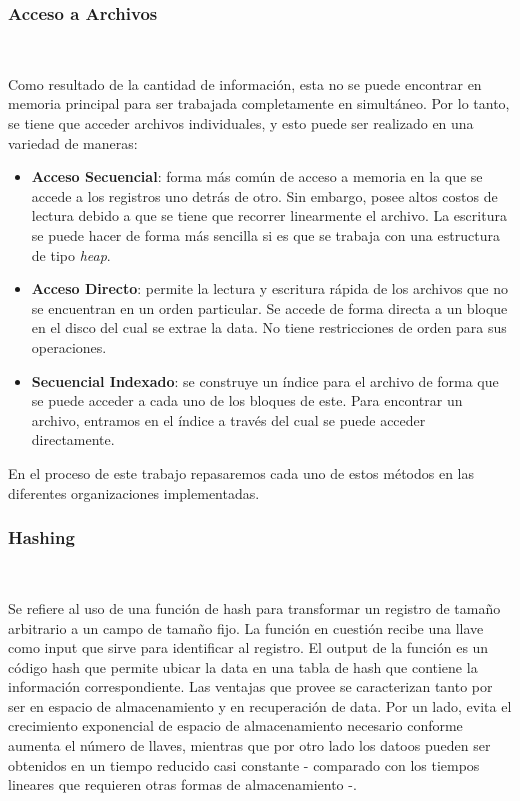 \documentclass{article}
\begin{document}
      \subsubsection{Acceso a Archivos} 
        
        Como resultado de la cantidad de información, esta no se puede encontrar en memoria principal para ser trabajada completamente en simultáneo. Por lo tanto, se tiene que acceder archivos individuales, y esto puede ser realizado en una variedad de maneras:

        \begin{itemize}
          
         \item \textbf{Acceso Secuencial}: forma más común de acceso a memoria en la que se accede a los registros uno detrás de otro. Sin embargo, posee altos costos de lectura debido a que se tiene que recorrer linearmente el archivo. La escritura se puede hacer de forma más sencilla si es que se trabaja con una estructura de tipo \textit{heap}.
         
         \item \textbf{Acceso Directo}: permite la lectura y escritura rápida de los archivos que no se encuentran en un orden particular. Se accede de forma directa a un bloque en el disco del cual se extrae la data. No tiene restricciones de orden para sus operaciones.
         
         \item \textbf{Secuencial Indexado}: se construye un índice para el archivo de forma que se puede acceder a cada uno de los bloques de este. Para encontrar un archivo, entramos en el índice a través del cual se puede acceder directamente. 

        \end{itemize}

        En el proceso de este trabajo repasaremos cada uno de estos métodos en las diferentes organizaciones implementadas.

      \subsubsection{Hashing} 
        
        Se refiere al uso de una función de hash para transformar un registro de tamaño arbitrario a un campo de tamaño fijo. La función en cuestión recibe una llave como input que sirve para identificar al registro. El output de la función es un código hash que permite ubicar la data en una tabla de hash que contiene la información correspondiente. Las ventajas que provee se caracterizan tanto por ser en espacio de almacenamiento y en recuperación de data. Por un lado, evita el crecimiento exponencial de espacio de almacenamiento necesario conforme aumenta el número de llaves, mientras que por otro lado los datoos pueden ser obtenidos en un tiempo reducido casi constante - comparado con los tiempos lineares que requieren otras formas de almacenamiento -.
\end{document}
